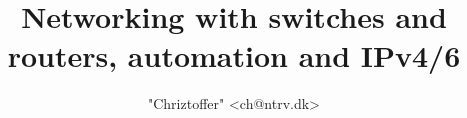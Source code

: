 \documentclass[a4paper,12pt,twoside,twocolumn,landscape]{book}
\title{Networking with switches and routers, automation and IPv4/6}
\author{"Chriztoffer" <ch@ntrv.dk>}
\begin{document}

\tableofcontents

\setlength{\parskip}{0.35em} %
\renewcommand{\baselinestretch}{1.15} %
















\clearpage
\printglossary[type=\acronymtype,title=Special Terms,toctitle=List of terms]


\renewcommand{\listfigurename}{List of {\footnotesize hidden} Figures}
\listoffigures


\renewcommand{\listtablename}{Tables {\footnotesize hidding} on the pages}
\listoftables




\end{document}
